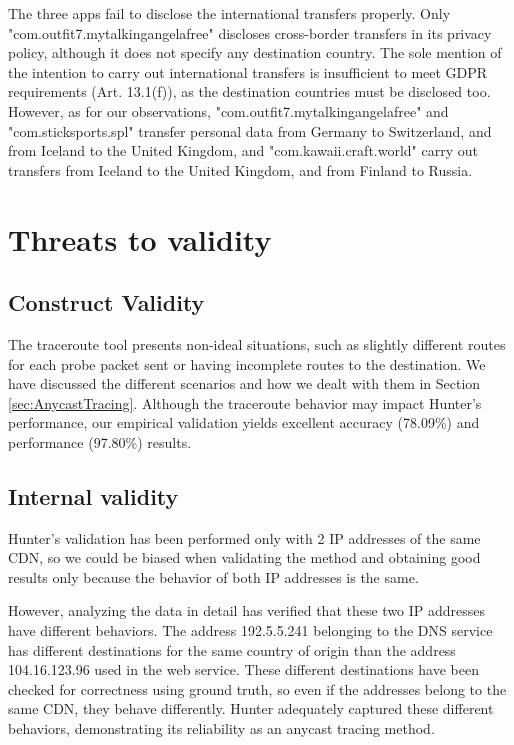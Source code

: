 \documentclass[preprint,12pt]{elsarticle}
\begin{document}
The three apps fail to disclose the international transfers properly. Only "com.outfit7.mytalkingangelafree" discloses cross-border transfers in its privacy policy, although it does not specify any destination country. The sole mention of the intention to carry out international transfers is insufficient to meet GDPR requirements (Art. 13.1(f)), as the destination countries must be disclosed too. However, as for our observations, "com.outfit7.mytalkingangelafree" and "com.sticksports.spl" transfer personal data from Germany to Switzerland, and from Iceland to the United Kingdom, and "com.kawaii.craft.world" carry out transfers from Iceland to the United Kingdom, and from Finland to Russia.

\section{Threats to validity}
\subsection{Construct Validity}
The traceroute tool presents non-ideal situations, such as slightly different routes for each probe packet sent or having incomplete routes to the destination. We have discussed the different scenarios and how we dealt with them in Section \ref{sec:AnycastTracing}. Although the traceroute behavior may impact Hunter's performance, our empirical validation yields excellent accuracy (78.09\%) and performance (97.80\%) results.

\subsection{Internal validity}
Hunter's validation has been performed only with 2 IP addresses of the same CDN, so we could be biased when validating the method and obtaining good results only because the behavior of both IP addresses is the same.

However, analyzing the data in detail has verified that these two IP addresses have different behaviors. The address 192.5.5.241 belonging to the DNS service has different destinations for the same country of origin than the address 104.16.123.96 used in the web service. These different destinations have been checked for correctness using ground truth, so even if the addresses belong to the same CDN, they behave differently. Hunter adequately captured these different behaviors, demonstrating its reliability as an anycast tracing method.
\end{document}
